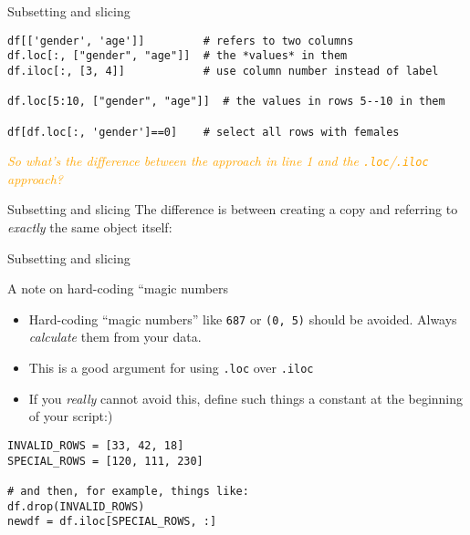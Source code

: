 \begin{frame}[fragile]{Subsetting and slicing}
\begin{verbatim}
df[['gender', 'age']]         # refers to two columns
df.loc[:, ["gender", "age"]]  # the *values* in them
df.iloc[:, [3, 4]]            # use column number instead of label

df.loc[5:10, ["gender", "age"]]  # the values in rows 5--10 in them

df[df.loc[:, 'gender']==0]    # select all rows with females
\end{verbatim}    
\pause

\emph{\textcolor{orange}{So what's the difference between the approach in line 1 and the \texttt{.loc}/\texttt{.iloc} approach?}}
\end{frame}



\begin{frame}{Subsetting and slicing}
  The difference is between creating a copy and referring to \emph{exactly} the same object itself:
\end{frame}








\begin{frame}[fragile]{Subsetting and slicing }
  \begin{block}{A note on hard-coding ``magic numbers}
    \begin{itemize}
    \item Hard-coding ``magic numbers'' like \texttt{687} or \texttt{(0, 5)} should be avoided. Always \emph{calculate} them from your data.
    \item This is a good argument for using \texttt{.loc} over \texttt{.iloc}
    \item If you \emph{really} cannot avoid this, define such things a constant at the beginning of your script:)      
    \end{itemize}
  \end{block}

\begin{verbatim}
INVALID_ROWS = [33, 42, 18]
SPECIAL_ROWS = [120, 111, 230]

# and then, for example, things like:
df.drop(INVALID_ROWS)
newdf = df.iloc[SPECIAL_ROWS, :]
\end{verbatim}
  
\end{frame}




